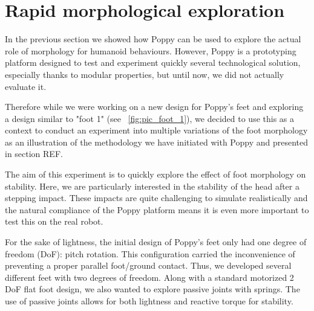 
\newpage
\section{Rapid morphological exploration} %
\label{sec:morphology-variable}

In the previous section we showed how Poppy can be used to explore the actual role of morphology for humanoid behaviours. However, Poppy is a prototyping platform designed to test and experiment quickly several technological solution, especially thanks to modular properties, but until now, we did not actually evaluate it.

Therefore while we were working on a new design for Poppy's feet and exploring a design similar to "foot 1" (see \figurename~\ref{fig:pic_foot_1}), we decided to use this as a context to conduct an experiment into multiple variations of the foot morphology as an illustration of the methodology we have initiated with Poppy and presented in section REF.


The aim of this experiment is to quickly explore the effect of foot morphology on stability. Here, we are particularly interested in the stability of the head after a stepping impact. These impacts are quite challenging to simulate realistically and the natural compliance of the Poppy platform means it is even more important to test this on the real robot.

For the sake of lightness, the initial design of Poppy's feet only had one degree of freedom (DoF): pitch rotation. This configuration carried the inconvenience of preventing a proper parallel foot/ground contact. Thus, we developed several different feet with two degrees of freedom. Along with a standard motorized 2 DoF flat foot design, we also wanted to explore passive joints with springs. The use of passive joints allows for both lightness and reactive torque for stability.


\begin{figure}[!b]
\centering
    \hfil
    \\
    \hfil
    \caption{}
    \label{fig:foot_variants}
\end{figure}


